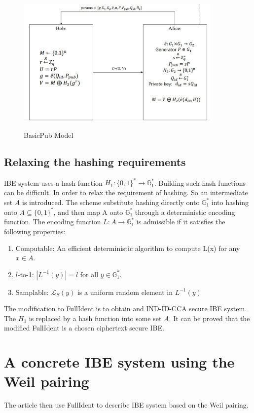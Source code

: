 \documentclass[runningheads,a4paper]{llncs}
\begin{document}
\begin{figure}[H]
\centering
\includegraphics[width=10cm, height=7cm]{basicpub.JPG}
\caption{BasicPub Model}
\end{figure}

\subsection{Relaxing the hashing requirements}
IBE system uses a hash function $H_1:\{0,1\}^*\rightarrow\mathbb{G}_1^*$. Building such hash functions can be difficult. In order to relax the requirement of hashing. So an intermediate set $A$ is introduced. The scheme substitute hashing directly onto $\mathbb{G}_1^*$ into hashing onto $A\subseteq\{0,1\}^*$, and then map A onto $\mathbb{G}_1^*$ through a deterministic encoding function. 
The encoding function $L:A\rightarrow\mathbb{G}_1^*$ is admissible if it satisfies the following properties:
\begin{enumerate}
	\item Computable: An efficient deterministic algorithm to compute L(x) for any $x\in A$.
	\item $l$-to-1: $|L^{-1}(y)|=l$ for all $y\in \mathbb{G}_1^*$.
	\item Samplable: $\mathcal{L}_S(y)$ is a uniform random element in $L^{-1}(y)$
\end{enumerate}
The modification to FullIdent is to obtain and IND-ID-CCA secure IBE system. The $H_1$ is replaced by a hash function into some set $A$. It can be proved that the modified FullIdent is a chosen ciphertext secure IBE.
 
\section{A concrete IBE system using the Weil pairing}
The article then use FullIdent to describe IBE system based on the Weil pairing. 
\end{document}
